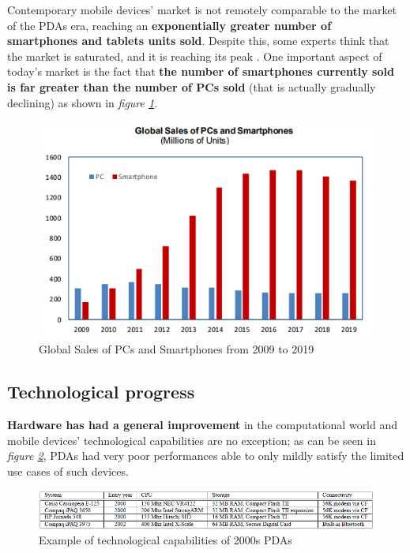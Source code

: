 Contemporary mobile devices' market is not remotely comparable to the market of the PDAs era, reaching an \textbf{exponentially greater number of smartphones and tablets units sold}. Despite this, some experts think that the market is saturated, and it is reaching its peak \cite{smartphones_sales}. One important aspect of today's market is the fact that \textbf{the number of smartphones currently sold is far greater than the number of PCs sold} (that is actually gradually declining) as shown in \textit{figure \ref{fig:global_sales_of_pcs_and_smartphones}}.

\begin{figure}[!ht]
    \centering
    \includegraphics[scale=0.9]{document/chapters/chapter_1/images/global_sales_of_pcs_and_smartphones.png}
    \caption{Global Sales of PCs and Smartphones from 2009 to 2019 \cite{smartphones_sales}}
    \label{fig:global_sales_of_pcs_and_smartphones}
\end{figure}

\subsection{Technological progress}\label{technological_progress}
\textbf{Hardware has had a general improvement} in the computational world and mobile devices' technological capabilities are no exception; as can be seen in \textit{figure \ref{fig:pda_capabilities}}, PDAs had very poor performances able to only mildly satisfy the limited use cases of such devices. 

\begin{figure}[!ht]
    \centering
    \includegraphics[scale=0.77]{document/chapters/chapter_1/images/pda_capabilities.png}
    \caption{Example of technological capabilities of 2000s PDAs \cite{integrating_mobile_devices_into_grid}}
    \label{fig:pda_capabilities}
\end{figure}

